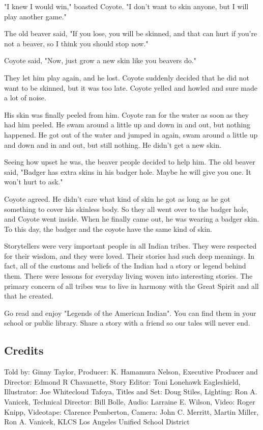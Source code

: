"I knew I would win," boasted Coyote. "I don't want to skin anyone, but I will play another game."

The old beaver said, "If you lose, you will be skinned, and that can hurt if you're not a beaver, so I think you should stop now."

Coyote said, "Now, just grow a new skin like you beavers do."

They let him play again, and he lost. Coyote suddenly decided that he did not want to be skinned, but it was too late. Coyote yelled and howled and sure made a lot of noise.

His skin was finally peeled from him. Coyote ran for the water as soon as they had him peeled. He swam around a little up and down in and out, but nothing happened. He got out of the water and jumped in again, swam around a little up and down and in and out, but still nothing. He didn't get a new skin.

Seeing how upset he was, the beaver people decided to help him. The old beaver said, "Badger has extra skins in his badger hole. Maybe he will give you one. It won't hurt to ask."

Coyote agreed. He didn't care what kind of skin he got as long as he got something to cover his skinless body. So they all went over to the badger hole, and Coyote went inside. When he finally came out, he was wearing a badger skin. To this day, the badger and the coyote have the same kind of skin.

Storytellers were very important people in all Indian tribes. They were respected for their wisdom, and they were loved. Their stories had such deep meanings. In fact, all of the customs and beliefs of the Indian had a story or legend behind them. There were lessons for everyday living woven into interesting stories. The primary concern of all tribes was to live in harmony with the Great Spirit and all that he created.

Go read and enjoy "Legends of the American Indian". You can find them in your school or public library. Share a story with a friend so our tales will never end.

\subsection{Credits}

Told by: Ginny Taylor,
Producer: K. Hamamura Nelson,
Executive Producer and Director: Edmond R Chavanette,
Story Editor: Toni Lonehawk Eagleshield,
Illustrator: Joe Whitecloud Tafoya,
Titles and Set: Doug Stiles,
Lighting: Ron A. Vanicek,
Technical Director: Bill Bolle,
Audio: Larraine E. Wilson,
Video: Roger Knipp,
Videotape: Clarence Pemberton,
Camera: John C. Merritt, Martin Miller, Ron A. Vanicek,
KLCS Los Angeles Unified School District

